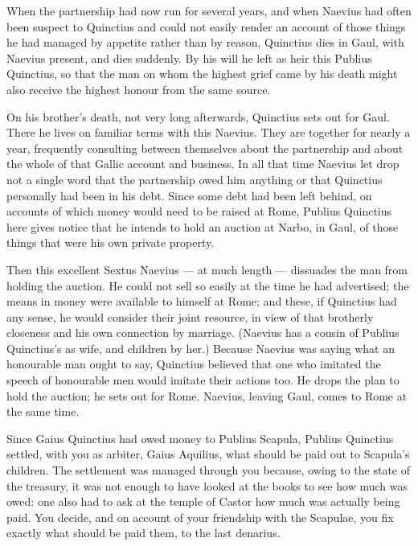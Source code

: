  When the partnership had now run for several years, and when Naevius had often been suspect to Quinctius and could not easily render an account of those things he had managed by appetite rather than by reason, Quinctius dies in Gaul, with Naevius present, and dies suddenly. By his will he left as heir this Publius Quinctius, so that the man on whom the highest grief came by his death might also receive the highest honour from the same source.

 On his brother's death, not very long afterwards, Quinctius sets out for Gaul. There he lives on familiar terms with this Naevius. They are together for nearly a year, frequently consulting between themselves about the partnership and about the whole of that Gallic account and business. In all that time Naevius let drop not a single word that the partnership owed him anything or that Quinctius personally had been in his debt. Since some debt had been left behind, on accounts of which money would need to be raised at Rome, Publius Quinctius here gives notice that he intends to hold an auction at Narbo, in Gaul, of those things that were his own private property.

 Then this excellent Sextus Naevius — at much length — dissuades the man from holding the auction. He could not sell so easily at the time he had advertised; the means in money were available to himself at Rome; and these, if Quinctius had any sense, he would consider their joint resource, in view of that brotherly closeness and his own connection by marriage. (Naevius has a cousin of Publius Quinctius's as wife, and children by her.) Because Naevius was saying what an honourable man ought to say, Quinctius believed that one who imitated the speech of honourable men would imitate their actions too. He drops the plan to hold the auction; he sets out for Rome. Naevius, leaving Gaul, comes to Rome at the same time.

 Since Gaius Quinctius had owed money to Publius Scapula, Publius Quinctius settled, with you as arbiter, Gaius Aquilius, what should be paid out to Scapula's children. The settlement was managed through you because, owing to the state of the treasury, it was not enough to have looked at the books to see how much was owed: one also had to ask at the temple of Castor how much was actually being paid. You decide, and on account of your friendship with the Scapulae, you fix exactly what should be paid them, to the last denarius.

